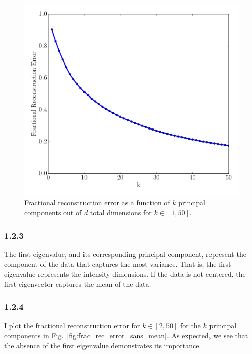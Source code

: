 \documentclass[12pt]{amsart}
\begin{document}
\begin{figure}[H]
	\includegraphics[width=\columnwidth]{fractional_rec_error.pdf}
    \caption{Fractional reconstruction error as a function of $k$ principal components out of $d$ total dimensions for $k \in [1,50]$.}
    \label{fig:frac_rec_error}
\end{figure}


\subsubsection*{1.2.3}

The first eigenvalue, and its corresponding principal component, represent the component of the data that captures the most variance.  That is, the first eigenvalue represents the intensity dimensions.  If the data is not centered, the first eigenvector captures the mean of the data.

\subsubsection*{1.2.4}

I plot the fractional reconstruction error for $k \in [2,50]$ for the $k$ principal components in Fig.~\ref{fig:frac_rec_error_sans_mean}.  As expected, we see that the absence of the first eigenvalue demonstrates its importance.
\end{document}
